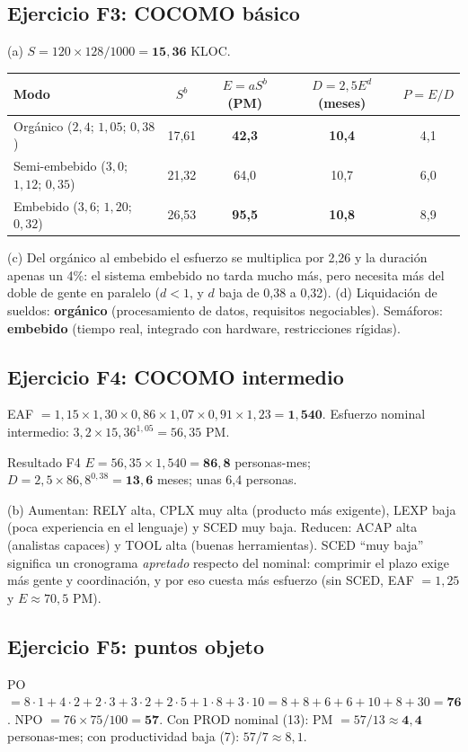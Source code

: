 \documentclass[11pt,a4paper]{article}
\begin{document}
\subsection*{Ejercicio F3: COCOMO básico}
(a) $S = 120 \times 128 / 1000 = \mathbf{15{,}36}$ KLOC.
\begin{center}\small
\begin{tabular}{lcccc}
\toprule
Modo & $S^b$ & $E = a S^b$ (PM) & $D = 2{,}5 E^d$ (meses) & $P = E/D$\\
\midrule
Orgánico ($2{,}4$; $1{,}05$; $0{,}38$) & 17,61 & \textbf{42,3} & \textbf{10,4} & 4,1\\
Semi-embebido ($3{,}0$; $1{,}12$; $0{,}35$) & 21,32 & 64,0 & 10,7 & 6,0\\
Embebido ($3{,}6$; $1{,}20$; $0{,}32$) & 26,53 & \textbf{95,5} & \textbf{10,8} & 8,9\\
\bottomrule
\end{tabular}
\end{center}
(c) Del orgánico al embebido el esfuerzo se multiplica por 2,26 y la duración apenas un 4\%: el sistema embebido
no tarda mucho más, pero necesita más del doble de gente en paralelo ($d < 1$, y $d$ baja de 0,38 a 0,32). (d)
Liquidación de sueldos: \textbf{orgánico} (procesamiento de datos, requisitos negociables). Semáforos:
\textbf{embebido} (tiempo real, integrado con hardware, restricciones rígidas).

\subsection*{Ejercicio F4: COCOMO intermedio}
EAF $= 1{,}15 \times 1{,}30 \times 0{,}86 \times 1{,}07 \times 0{,}91 \times 1{,}23 = \mathbf{1{,}540}$. Esfuerzo
nominal intermedio: $3{,}2 \times 15{,}36^{1{,}05} = 56{,}35$ PM.
\begin{resultado}{Resultado F4}
$E = 56{,}35 \times 1{,}540 = \mathbf{86{,}8}$ personas-mes; $D = 2{,}5 \times 86{,}8^{0{,}38} = \mathbf{13{,}6}$
meses; unas 6,4 personas.
\end{resultado}
(b) Aumentan: RELY alta, CPLX muy alta (producto más exigente), LEXP baja (poca experiencia en el lenguaje) y SCED
muy baja. Reducen: ACAP alta (analistas capaces) y TOOL alta (buenas herramientas). SCED ``muy baja'' significa
un cronograma \emph{apretado} respecto del nominal: comprimir el plazo exige más gente y coordinación, y por eso
cuesta más esfuerzo (sin SCED, EAF $= 1{,}25$ y $E \approx 70{,}5$ PM).

\subsection*{Ejercicio F5: puntos objeto}
PO $= 8 \cdot 1 + 4 \cdot 2 + 2 \cdot 3 + 3 \cdot 2 + 2 \cdot 5 + 1 \cdot 8 + 3 \cdot 10 = 8 + 8 + 6 + 6 + 10 + 8 + 30
= \mathbf{76}$. NPO $= 76 \times 75/100 = \mathbf{57}$. Con PROD nominal (13): PM $= 57/13 \approx
\mathbf{4{,}4}$ personas-mes; con productividad baja (7): $57/7 \approx 8{,}1$.
\end{document}
